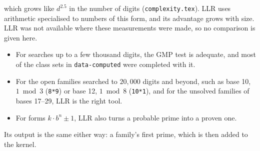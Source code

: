 \documentclass[11pt]{article}
\newcommand{\code}[1]{\texttt{#1}}
\begin{document}
which grows like $d^{2.5}$ in the number of digits (\code{complexity.tex}). LLR uses arithmetic specialised to numbers of this form, and its advantage grows with size. LLR was not available where these measurements were made, so no comparison is given here.
\begin{itemize}
\item For searches up to a few thousand digits, the GMP test is adequate, and most of the class sets in \code{data-computed} were completed with it.
\item For the open families searched to $20{,}000$ digits and beyond, such as base 10, $1 \bmod 3$ (\code{8*9}) or base 12, $1 \bmod 8$ (\code{10*1}), and for the unsolved families of bases 17--29, LLR is the right tool.
\item For forms $k\cdot b^n\pm1$, LLR also turns a probable prime into a proven one.
\end{itemize}
Its output is the same either way: a family's first prime, which is then added to the kernel.
\end{document}

